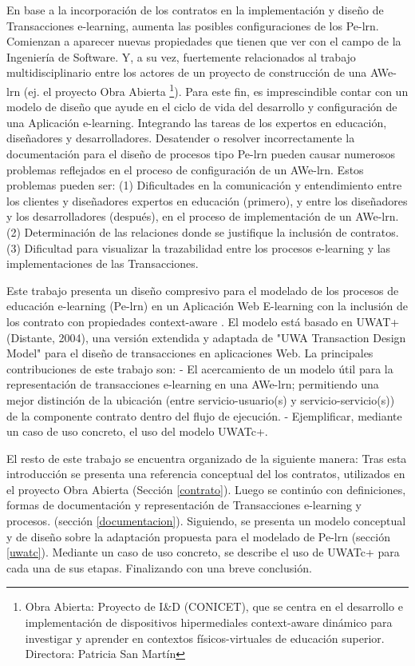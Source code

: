 En base a la incorporación de los contratos en la implementación y diseño de
Transacciones e-learning, aumenta las posibles configuraciones de los Pe-lrn.
Comienzan a aparecer nuevas propiedades que  tienen que ver con el campo de la
Ingeniería de Software. Y, a su vez,  fuertemente relacionados al trabajo
multidisciplinario entre los actores de un proyecto de construcción de una
AWe-lrn (ej. el proyecto Obra Abierta \footnote{Obra Abierta: Proyecto de I&D
(CONICET), que se centra en el desarrollo e implementación de dispositivos
hipermediales context-aware dinámico para investigar y aprender en contextos
físicos-virtuales de educación superior. Directora: Patricia San Martín }). Para
este fin, es imprescindible contar con un modelo de diseño que ayude en el ciclo
de vida del desarrollo y configuración de una Aplicación e-learning. Integrando
las tareas de los expertos en educación, diseñadores y desarrolladores.
Desatender o resolver incorrectamente la documentación para el diseño de
procesos tipo Pe-lrn pueden causar numerosos problemas reflejados en el proceso
de configuración  de un AWe-lrn. Estos problemas pueden ser: (1) Dificultades en
la comunicación y entendimiento entre los clientes y diseñadores expertos en
educación (primero), y entre los diseñadores y los desarrolladores (después), en
el proceso de implementación de un AWe-lrn. (2) Determinación de las relaciones
donde se justifique la inclusión de contratos. (3) Dificultad para visualizar la
trazabilidad entre los procesos e-learning y las implementaciones de las
Transacciones.

Este trabajo presenta un diseño compresivo para el modelado de los procesos de
educación e-learning (Pe-lrn) en un Aplicación Web E-learning con la inclusión
de los contrato con propiedades context-aware \cite{libro}. El modelo está
basado en UWAT+ (Distante, 2004), una versión extendida y adaptada de "UWA
Transaction Design Model" para el diseño de transacciones en aplicaciones Web.
La principales contribuciones de este trabajo son: - El acercamiento de un
modelo útil para la representación de transacciones e-learning en una AWe-lrn;
permitiendo una mejor distinción de la ubicación (entre servicio-usuario(s) y
servicio-servicio(s)) de la componente contrato dentro del flujo de ejecución. -
Ejemplificar, mediante un caso de uso concreto,  el uso del modelo UWATc+.


El resto de este trabajo se encuentra organizado de la siguiente manera: Tras
esta introducción se presenta una referencia conceptual del los contratos,
utilizados en el proyecto Obra Abierta (Sección \ref{contrato}). Luego se
continúo con definiciones, formas de documentación y representación de
Transacciones e-learning y procesos. (sección \ref{documentacion}). Siguiendo,
se presenta un modelo conceptual y de diseño sobre la adaptación propuesta para
el modelado de Pe-lrn (sección \ref{uwatc}). Mediante un caso de uso concreto,
se describe el uso de UWATc+ para cada una de sus etapas. Finalizando con una
breve conclusión.



